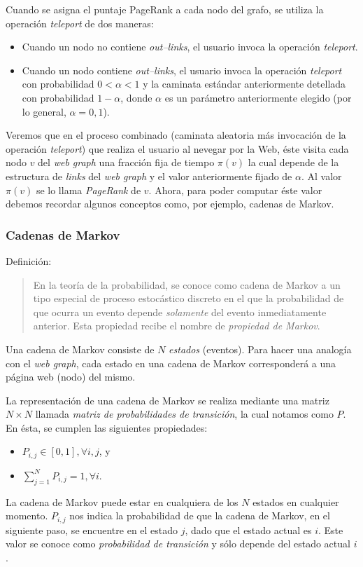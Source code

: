 		Cuando se asigna el puntaje PageRank a cada nodo del grafo, se utiliza la operación \textit{teleport} de dos maneras:
		\begin{itemize}
			\item Cuando un nodo no contiene \textit{out--links}, el usuario invoca la operación \textit{teleport}.
			\item Cuando un nodo contiene \textit{out--links}, el usuario invoca la operación \textit{teleport} con probabilidad $0 < \alpha < 1$ y la caminata estándar anteriormente detellada con probabilidad $1 - \alpha$, donde $\alpha$ es un parámetro anteriormente elegido (por lo general, $\alpha = 0,1$).
		\end{itemize}
		
		Veremos que en el proceso combinado (caminata aleatoria más invocación de la operación \textit{teleport}) que realiza el usuario al nevegar por la Web, éste visita cada nodo $v$ del \textit{web graph} una fracción fija de tiempo $\pi (v)$ la cual depende de la estructura de \textit{links} del \textit{web graph} y el valor anteriormente fijado de $\alpha$. Al valor $\pi (v)$ se lo llama \textit{PageRank} de $v$. Ahora, para poder computar éste valor debemos recordar algunos conceptos como, por ejemplo, cadenas de Markov.
		
		\subsubsection{Cadenas de Markov}
			Definición:
			\begin{quote}
				En la teoría de la probabilidad, se conoce como cadena de Markov a un tipo especial de proceso estocástico discreto en el que la probabilidad de que ocurra un evento depende \textit{solamente} del evento inmediatamente anterior. Esta propiedad recibe el nombre de \textit{propiedad de Markov}.
			\end{quote}
			
			Una cadena de Markov consiste de $N$ \textit{estados} (eventos). Para hacer una analogía con el \textit{web graph}, cada estado en una cadena de Markov corresponderá a una página web (nodo) del mismo. \par
			
			La representación de una cadena de Markov se realiza mediante una matriz $N \times N$ llamada \textit{matriz de probabilidades de transición}, la cual notamos como $P$. En ésta, se cumplen las siguientes propiedades:
			\begin{itemize}
				\item $P_{i,j} \in [0,1], \forall i,j$, y
				\item $\sum_{j = 1}^{N} P_{i,j} = 1, \forall i$.
			\end{itemize}
			La cadena de Markov puede estar en cualquiera de los $N$ estados en cualquier momento. $P_{i,j}$ nos indica la probabilidad de que la cadena de Markov, en el siguiente paso, se encuentre en el estado $j$, dado que el estado actual es $i$. Este valor se conoce como \textit{probabilidad de transición} y sólo depende del estado actual $i$. \par
			
